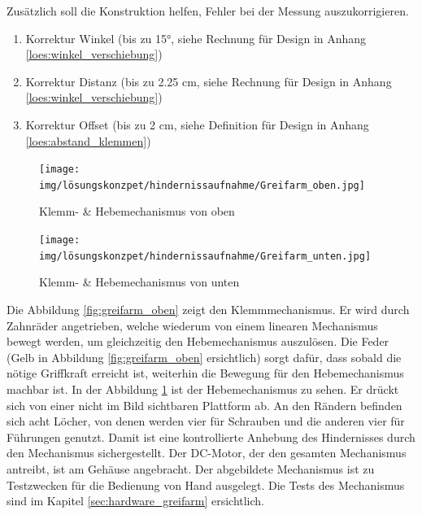 \documentclass[../main.tex]{subfiles}
\begin{document}
Zusätzlich soll die Konstruktion helfen, Fehler bei der Messung auszukorrigieren.
\begin{enumerate}
    \item Korrektur Winkel (bis zu 15°, siehe Rechnung für Design in Anhang \ref{loes:winkel_verschiebung})
    \item Korrektur Distanz (bis zu 2.25 cm, siehe Rechnung für Design in Anhang \ref{loes:winkel_verschiebung})
    \item Korrektur Offset (bis zu 2 cm, siehe Definition für Design in Anhang \ref{loes:abstand_klemmen})
\end{enumerate}

\begin{figure}[h!]
    \centering
    \begin{minipage}[t]{0.45\textwidth}
        \centering
        \texttt{[image: img/lösungskonzpet/hindernissaufnahme/Greifarm\_oben.jpg]}
        \caption{Klemm- \& Hebemechanismus von oben}
        \label{fig:greifarm_oben}
    \end{minipage}
    \hfill
    \begin{minipage}[t]{0.45\textwidth}
        \centering
        \texttt{[image: img/lösungskonzpet/hindernissaufnahme/Greifarm\_unten.jpg]}
        \caption{Klemm- \& Hebemechanismus von unten}
        \label{fig:greifarm_unten}
    \end{minipage}
\end{figure}
\newpage
Die Abbildung \ref{fig:greifarm_oben} zeigt den Klemmmechanismus. Er wird durch Zahnräder angetrieben, welche wiederum von einem linearen Mechanismus bewegt werden, um gleichzeitig den Hebemechanismus auszulösen. Die Feder (Gelb in Abbildung \ref{fig:greifarm_oben} ersichtlich) sorgt dafür, dass sobald die nötige Griffkraft erreicht ist, weiterhin die Bewegung für den Hebemechanismus machbar ist. In der Abbildung \ref{fig:greifarm_unten} ist der Hebemechanismus zu sehen. Er drückt sich von einer nicht im Bild sichtbaren Plattform ab. An den Rändern befinden sich acht Löcher, von denen werden vier für Schrauben und die anderen vier für Führungen genutzt. Damit ist eine kontrollierte Anhebung des Hindernisses durch den Mechanismus sichergestellt.
Der DC-Motor, der den gesamten Mechanismus antreibt, ist am Gehäuse angebracht.
Der abgebildete Mechanismus ist zu Testzwecken für die Bedienung von Hand ausgelegt. Die Tests des Mechanismus sind im Kapitel \ref{sec:hardware_greifarm} ersichtlich.
\end{document}
